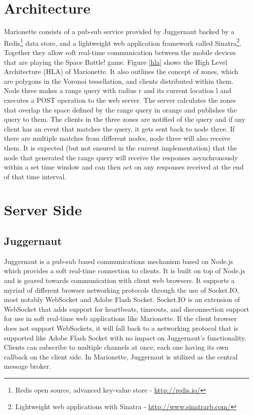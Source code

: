 \documentclass[12pt]{report}	%
\theoremstyle{definition}
\theoremstyle{remark}
\begin{document}
\section{Architecture}

Marionette consists of a pub-sub service provided by Juggernaut backed
by a Redis\footnote{Redis open source, advanced key-value store - \url{http://redis.io/}} 
data store, and a lightweight web application framework
called Sinatra\footnote{Lightweight web applications with Sinatra - \url{http://www.sinatrarb.com/}}. 
Together they allow soft real-time communication between
the mobile devices that are playing the Space Battle! game. Figure
\ref{hla} shows the High Level Architecture (HLA) of
Marionette. It also outlines the concept of zones, which are polygons in
the Voronoi tessellation, and clients distributed within them. Node three
makes a range query with radius r and its current location l and
executes a POST operation to the web server. The server calculates the
zones that overlap the space defined by the range query in orange and
publishes the query to them. The clients in the three zones are notified
of the query and if any client has an event that matches the query, it
gets sent back to node three. If there are multiple matches from
different nodes, node three will also receive them. It is expected 
(but not ensured in the current implementation) that
the node that generated the range query will receive the responses
asynchronously within a set time window and can then act on any
responses received at the end of that time interval.

\section{Server Side}

\subsection{Juggernaut}

Juggernaut is a pub-sub based communications mechanism based on Node.js which provides a
soft real-time connection to clients. It is built on top of Node.js and
is geared towards communication with client web browsers. It supports a
myriad of different browser networking protocols through the use of
Socket.IO, most notably WebSocket and Adobe Flash Socket. Socket.IO is
an extension of WebSocket that adds support for heartbeats, timeouts,
and disconnection support for use in soft real-time web applications
like Marionette. If the client browser does not support WebSockets, it
will fall back to a networking protocol that is supported like Adobe Flash 
Socket with no impact on Juggernaut's functionality. Clients can
subscribe to multiple channels at once, each one having its own callback
on the client side. In Marionette, Juggernaut is utilized as the central message broker.
\end{document}
